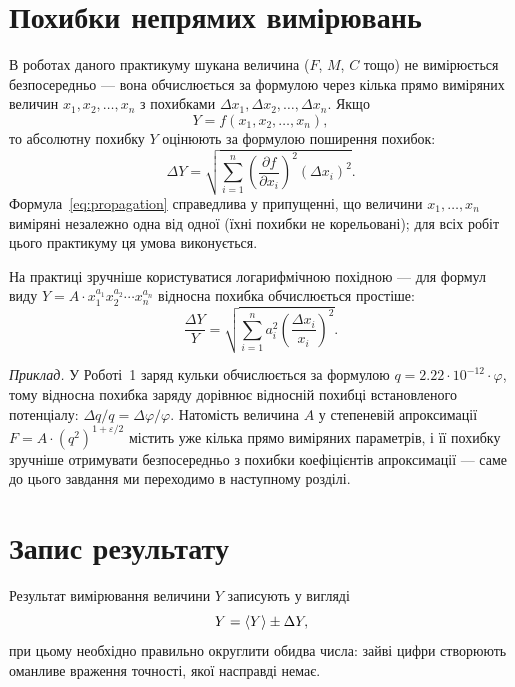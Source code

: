 \section{Похибки непрямих вимірювань}
\label{sec:propagation}

В роботах даного практикуму шукана величина ($F$, $M$, $C$ тощо) не вимірюється безпосередньо --- вона обчислюється за
формулою через кілька прямо виміряних величин $x_1, x_2, \ldots, x_n$
з похибками $\Delta x_1, \Delta x_2, \ldots, \Delta x_n$. Якщо
\begin{equation}\label{eq:function}
	Y = f(x_1, x_2, \ldots, x_n),
\end{equation}
то абсолютну похибку $Y$ оцінюють за формулою поширення похибок:
\begin{equation}\label{eq:propagation}
	\Delta Y = \sqrt{\sum_{i=1}^{n} \left( \frac{\partial f}{\partial x_i} \right)^2 (\Delta x_i)^2}.
\end{equation}
Формула~\eqref{eq:propagation} справедлива у припущенні, що величини
$x_1, \ldots, x_n$ виміряні незалежно одна від одної (їхні похибки не
корельовані); для всіх робіт цього практикуму ця умова виконується.

На практиці зручніше користуватися логарифмічною похідною --- для
формул виду $Y = A \cdot x_1^{a_1} x_2^{a_2} \cdots x_n^{a_n}$
відносна похибка обчислюється простіше:
\begin{equation}\label{eq:rel_propagation}
	\frac{\Delta Y}{Y} = \sqrt{\sum_{i=1}^{n} a_i^2 \left( \frac{\Delta x_i}{x_i} \right)^2}.
\end{equation}

\textit{Приклад.} У Роботі~1 заряд кульки обчислюється за формулою
$q = 2.22\cdot 10^{-12}\cdot \varphi$, тому відносна похибка заряду
дорівнює відносній похибці встановленого потенціалу: $\Delta q / q =
\Delta \varphi / \varphi$. Натомість величина $A$ у степеневій
апроксимації $F = A\cdot (q^2)^{1+\varepsilon/2}$ містить уже кілька
прямо виміряних параметрів, і її похибку зручніше отримувати
безпосередньо з похибки коефіцієнтів апроксимації --- саме до цього
завдання ми переходимо в наступному розділі.

\section{Запис результату}
\label{sec:rounding}

Результат вимірювання величини $Y$ записують у вигляді
\begin{equation}\label{eq:result}
	Y = \left\langle Y \right\rangle \pm \Delta Y,
\end{equation}
при цьому необхідно правильно округлити обидва числа: зайві цифри
створюють оманливе враження точності, якої насправді немає.

